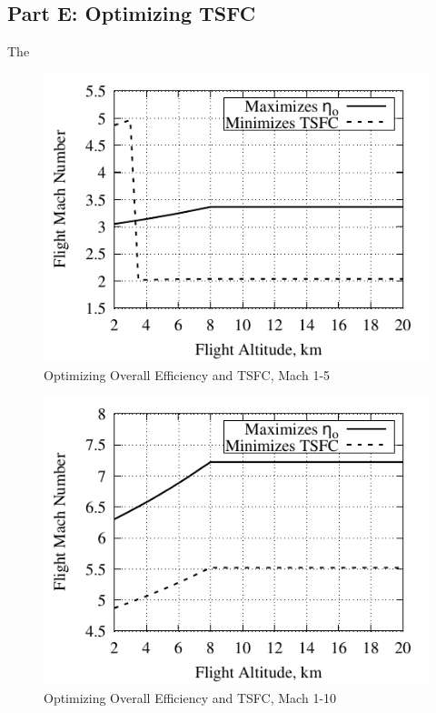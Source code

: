 \documentclass[conf]{new-aiaa} %
\begin{document}
\subsection{Part E: Optimizing TSFC}
The

\begin{figure}[hbt!] %
    \centering
    \includegraphics[]{media/performance_parameter_files/part_e_range_1_5.pdf}
    \caption{\label{fig:parte1-5}Optimizing Overall Efficiency and TSFC, Mach 1-5}
\end{figure}

\begin{figure}[hbt!] %
    \centering
    \includegraphics[]{media/performance_parameter_files/part_e_range_1_10.pdf}
    \caption{\label{fig:parte1-10}Optimizing Overall Efficiency and TSFC, Mach 1-10}
\end{figure}
\end{document}
